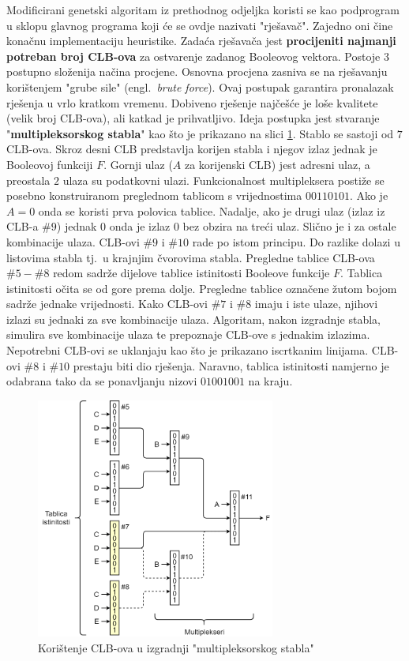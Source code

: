 \documentclass[times, utf8, diplomski]{fer}
\begin{document}
Modificirani genetski algoritam iz prethodnog odjeljka koristi se kao podprogram u sklopu glavnog programa koji će se ovdje nazivati "rješavač". Zajedno oni čine konačnu implementaciju heuristike. Zadaća rješavača jest \textbf{procijeniti najmanji potreban broj CLB-ova} za ostvarenje zadanog Booleovog vektora. Postoje $3$ postupno složenija načina procjene. Osnovna procjena zasniva se na rješavanju korištenjem "grube sile" (engl.~\textit{brute force}). Ovaj postupak garantira pronalazak rješenja u vrlo kratkom vremenu. Dobiveno rješenje najčešće je loše kvalitete (velik broj CLB-ova), ali katkad je prihvatljivo. Ideja postupka jest stvaranje "\textbf{multipleksorskog stabla}" kao što je prikazano na slici \ref{fig:brute}. Stablo se sastoji od $7$ CLB-ova. Skroz desni CLB predstavlja korijen stabla i njegov izlaz jednak je Booleovoj funkciji $F$. Gornji ulaz ($A$ za korijenski CLB) jest adresni ulaz, a preostala $2$ ulaza su podatkovni ulazi. Funkcionalnost multipleksera postiže se posebno konstruiranom preglednom tablicom s vrijednostima $00110101$. Ako je $A=0$ onda se koristi prva polovica tablice. Nadalje, ako je drugi ulaz (izlaz iz CLB-a $\#9$) jednak $0$ onda je izlaz $0$ bez obzira na treći ulaz. Slično je i za ostale kombinacije ulaza. CLB-ovi $\#9$ i $\#10$ rade po istom principu. Do razlike dolazi u listovima stabla tj.~u krajnjim čvorovima stabla. Pregledne tablice CLB-ova $\#5-\#8$ redom sadrže dijelove tablice istinitosti Booleove funkcije $F$. Tablica istinitosti očita se od gore prema dolje. Pregledne tablice označene žutom bojom sadrže jednake vrijednosti. Kako CLB-ovi $\#7$ i $\#8$ imaju i iste ulaze, njihovi izlazi su jednaki za sve kombinacije ulaza. Algoritam, nakon izgradnje stabla, simulira sve kombinacije ulaza te prepoznaje CLB-ove s jednakim izlazima. Nepotrebni CLB-ovi se uklanjaju kao što je prikazano iscrtkanim linijama. CLB-ovi $\#8$ i $\#10$ prestaju biti dio rješenja. Naravno, tablica istinitosti namjerno je odabrana tako da se ponavljanju nizovi $01001001$ na kraju.

\begin{figure}[htb]
	\centering
	\includegraphics[width=0.7\textwidth]{img/brute.png}
	\caption{Korištenje CLB-ova u izgradnji "multipleksorskog stabla"}
	\label{fig:brute}
\end{figure}
\end{document}

